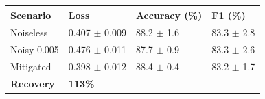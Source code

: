 \begin{tabular}{llll}
\toprule
Scenario & Loss & Accuracy (\%) & F1 (\%) \\
\midrule
Noiseless & 0.407 $\pm$ 0.009 & 88.2 $\pm$ 1.6 & 83.3 $\pm$ 2.8 \\
Noisy 0.005 & 0.476 $\pm$ 0.011 & 87.7 $\pm$ 0.9 & 83.3 $\pm$ 2.6 \\
Mitigated & 0.398 $\pm$ 0.012 & 88.4 $\pm$ 0.4 & 83.2 $\pm$ 1.7 \\
\textbf{Recovery} & \textbf{113\%} & --- & --- \\
\bottomrule
\end{tabular}
